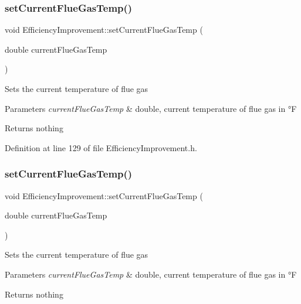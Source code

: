 \subsubsection{\texorpdfstring{set\+Current\+Flue\+Gas\+Temp()}{setCurrentFlueGasTemp()}\hspace{0.1cm}{\footnotesize\ttfamily [1/3]}}
{\footnotesize\ttfamily void Efficiency\+Improvement\+::set\+Current\+Flue\+Gas\+Temp (\begin{DoxyParamCaption}\item[{double}]{current\+Flue\+Gas\+Temp }\end{DoxyParamCaption})\hspace{0.3cm}{\ttfamily [inline]}}

Sets the current temperature of flue gas


\begin{DoxyParams}{Parameters}
{\em current\+Flue\+Gas\+Temp} & double, current temperature of flue gas in °F\\
\hline
\end{DoxyParams}
\begin{DoxyReturn}{Returns}
nothing 
\end{DoxyReturn}


Definition at line 129 of file Efficiency\+Improvement.\+h.

\mbox{\label{class_efficiency_improvement_aef6ffeae5135982ef223ce4a5efe23d8}} 
\subsubsection{\texorpdfstring{set\+Current\+Flue\+Gas\+Temp()}{setCurrentFlueGasTemp()}\hspace{0.1cm}{\footnotesize\ttfamily [2/3]}}
{\footnotesize\ttfamily void Efficiency\+Improvement\+::set\+Current\+Flue\+Gas\+Temp (\begin{DoxyParamCaption}\item[{double}]{current\+Flue\+Gas\+Temp }\end{DoxyParamCaption})\hspace{0.3cm}{\ttfamily [inline]}}

Sets the current temperature of flue gas


\begin{DoxyParams}{Parameters}
{\em current\+Flue\+Gas\+Temp} & double, current temperature of flue gas in °F\\
\hline
\end{DoxyParams}
\begin{DoxyReturn}{Returns}
nothing 
\end{DoxyReturn}


